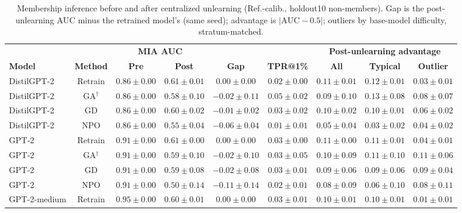 \begin{table}[t]
\centering
\caption{Membership inference before and after centralized unlearning (Ref.-calib., holdout10 non-members). Gap is the post-unlearning AUC minus the retrained model's (same seed); advantage is $|\mathrm{AUC}-0.5|$; outliers by base-model difficulty, stratum-matched.}
\label{tab:central-ref-calibrated-holdout10}
\footnotesize
\renewcommand{\arraystretch}{1.2}
\setlength{\tabcolsep}{3pt}
\begin{tabular*}{\textwidth}{@{\extracolsep{\fill}}lcccccccc@{}}
\toprule
 & & \multicolumn{2}{c}{\textbf{MIA AUC}} & & & \multicolumn{3}{c}{\textbf{Post-unlearning advantage}} \\
\cmidrule(lr){3-4}\cmidrule(lr){7-9}
\textbf{Model} & \textbf{Method} & \textbf{Pre} & \textbf{Post} & \textbf{Gap} & \textbf{TPR@1\%} & \textbf{All} & \textbf{Typical} & \textbf{Outlier} \\
\midrule
DistilGPT-2 & Retrain & $0.86 \pm 0.00$ & $0.61 \pm 0.01$ & $0.00 \pm 0.00$ & $0.02 \pm 0.00$ & $0.11 \pm 0.01$ & $0.12 \pm 0.01$ & $0.03 \pm 0.01$ \\
DistilGPT-2 & GA$^{\dagger}$ & $0.86 \pm 0.00$ & $0.58 \pm 0.10$ & $-0.02 \pm 0.11$ & $0.05 \pm 0.02$ & $0.09 \pm 0.10$ & $0.13 \pm 0.08$ & $0.08 \pm 0.07$ \\
DistilGPT-2 & GD & $0.86 \pm 0.00$ & $0.60 \pm 0.02$ & $-0.01 \pm 0.02$ & $0.03 \pm 0.02$ & $0.10 \pm 0.02$ & $0.10 \pm 0.01$ & $0.06 \pm 0.02$ \\
DistilGPT-2 & NPO & $0.86 \pm 0.00$ & $0.55 \pm 0.04$ & $-0.06 \pm 0.04$ & $0.01 \pm 0.01$ & $0.05 \pm 0.04$ & $0.03 \pm 0.02$ & $0.04 \pm 0.02$ \\
GPT-2 & Retrain & $0.91 \pm 0.00$ & $0.61 \pm 0.00$ & $0.00 \pm 0.00$ & $0.03 \pm 0.00$ & $0.11 \pm 0.00$ & $0.11 \pm 0.01$ & $0.04 \pm 0.01$ \\
GPT-2 & GA$^{\dagger}$ & $0.91 \pm 0.00$ & $0.59 \pm 0.10$ & $-0.02 \pm 0.10$ & $0.03 \pm 0.05$ & $0.10 \pm 0.09$ & $0.11 \pm 0.10$ & $0.11 \pm 0.06$ \\
GPT-2 & GD & $0.91 \pm 0.00$ & $0.59 \pm 0.08$ & $-0.02 \pm 0.08$ & $0.03 \pm 0.01$ & $0.09 \pm 0.06$ & $0.09 \pm 0.06$ & $0.09 \pm 0.04$ \\
GPT-2 & NPO & $0.91 \pm 0.00$ & $0.50 \pm 0.14$ & $-0.11 \pm 0.14$ & $0.02 \pm 0.01$ & $0.08 \pm 0.09$ & $0.06 \pm 0.10$ & $0.08 \pm 0.11$ \\
GPT-2-medium & Retrain & $0.95 \pm 0.00$ & $0.60 \pm 0.01$ & $0.00 \pm 0.00$ & $0.03 \pm 0.01$ & $0.10 \pm 0.01$ & $0.10 \pm 0.01$ & $0.01 \pm 0.01$ \\

\end{tabular*}
\end{table}
